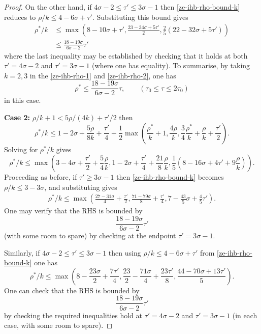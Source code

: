 \documentclass[a4paper, 10pt]{amsart}
\begin{document}
\begin{proof}
On the other hand, if $4\sigma - 2 \le \tau' \le 3\sigma - 1$ then \eqref{ze-ihb-rho-bound-k} reduces to $\rho/k \le 4 - 6\sigma + \tau'$. Substituting this bound gives
\begin{equation}
\begin{split}
\rho^*/k &\le \max\left(8 -10\sigma + \tau',\frac{23 - 34\sigma + 5\tau'}{2}, \frac{2}{5}(22 - 32\sigma +  5\tau')\right)\\
&\le \frac{18 - 19\sigma}{6\sigma - 2}\tau'\label{ze-ihb-rho-2}
\end{split}
\end{equation}
where the last inequality may be established by checking that it holds at both $\tau' = 4\sigma - 2$ and $\tau' = 3\sigma - 1$ (where one has equality). To summarise, by taking $k = 2, 3$ in the \eqref{ze-ihb-rho-1} and \eqref{ze-ihb-rho-2}, one has 
\[
\rho^* \le \frac{18 - 19\sigma}{6\sigma - 2}\tau,\qquad (\tau_0 \le \tau \le 2\tau_0)
\]
in this case. 

\textbf{Case 2:} $\rho/k + 1 < 5\rho/(4k) + \tau'/2$ then
\[
\rho^*/k \leq 1-2\sigma + \frac{5\rho}{8k} + \frac{\tau'}{4} + \frac{1}{2}\max\left(\frac{\rho^*}{k}+1, \frac{4\rho}{k}, \frac{3}{4}\frac{\rho^*}{k} + \frac{\rho}{k}+\frac{\tau'}{2}\right).
\]
Solving for $\rho^*/k$ gives
\[
\rho^*/k \le \max\left(3 - 4\sigma + \frac{\tau'}{2} + \frac{5}{4}\frac{\rho}{k}, 1 - 2\sigma + \frac{\tau'}{4} + \frac{21}{8}\frac{\rho}{k}, \frac{1}{5}(8 - 16\sigma + 4\tau' + 9\frac{\rho}{k})\right).
\]
Proceeding as before, if $\tau' \ge 3\sigma - 1$ then \eqref{ze-ihb-rho-bound-k} becomes $\rho/k \le 3 - 3\sigma$, and substituting gives
\begin{align*}
\rho^*/k \le \max\left(\frac{27-31\sigma}{4} + \frac{\tau'}{2}, \frac{71-79\sigma}{8}+\frac{\tau'}{4}, 7-\frac{43}{5}\sigma + \frac{4}{5}\tau'\right).
\end{align*}
One may verify that the RHS is bounded by 
\[
\frac{18 - 19\sigma}{6\sigma - 2}\tau'
\]
(with some room to spare) by checking at the endpoint $\tau' = 3\sigma - 1$. 

Similarly, if $4\sigma - 2 \le \tau' \le 3\sigma - 1$ then using $\rho/k \le 4 - 6\sigma + \tau'$ from \eqref{ze-ihb-rho-bound-k} one has
\[
\rho^*/k \le \max\left(8 - \frac{23\sigma}{2} + \frac{7\tau'}{4}, \frac{23}{2} - \frac{71\sigma}{4} + \frac{23\tau'}{8}, \frac{44 - 70\sigma + 13\tau'}{5}\right).
\]
One can check that the RHS is bounded by 
\[
\frac{18 - 19\sigma}{6\sigma - 2}\tau'
\]
by checking the required inequalities hold at $\tau' = 4\sigma - 2$ and $\tau' = 3\sigma - 1$ (in each case, with some room to spare). 


\end{proof}
\end{document}
